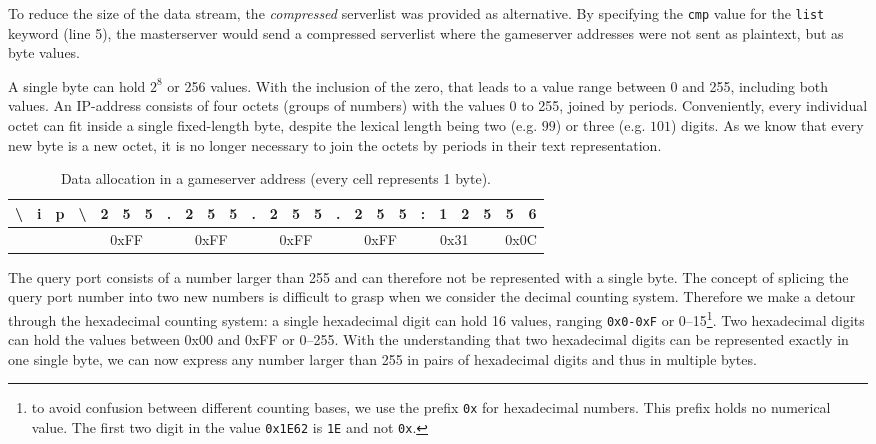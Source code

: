 To reduce the size of the data stream, the \emph{compressed} serverlist was provided as alternative. By specifying the {\tt cmp} value for the {\tt list} keyword (line 5), the masterserver would send a compressed serverlist where the gameserver addresses were not sent as plaintext, but as byte values. 

A single byte can hold $2^8$ or 256 values. With the inclusion of the zero, that leads to a value range between 0 and 255, including both values. An IP-address consists of four octets (groups of numbers) with the values 0 to 255, joined by periods. Conveniently, every individual octet can fit inside a single fixed-length byte, despite the lexical length being two (e.g. $99$) or three (e.g. $101$) digits. As we know that every new byte is a new octet, it is no longer necessary to join the octets by periods in their text representation. 

\begin{table}[h]
\centering
\begin{tabular}{ |c|c|c|c |c|c|c| c |c|c|c| c |c|c|c| c |c|c|c| c |c|c|c|c|c|c| }
\hline
\textbackslash&i&p&\textbackslash&2&5&5&.&2&5&5&.&2&5&5&.&2&5&5&
:&1&2&\multicolumn{2}{|c|}{5}&5&6\\
\hline
\multicolumn{4}{|c|}{} & 
\multicolumn{3}{|c|}{0xFF}& &
\multicolumn{3}{|c|}{0xFF}& & 
\multicolumn{3}{|c|}{0xFF}& & 
\multicolumn{3}{|c|}{0xFF}& & 
\multicolumn{2}{|c}{0x31}& &  %
\multicolumn{3}{|c|}{0x0C}\\
\hline
\end{tabular}
\caption{Data allocation in a gameserver address (every cell represents 1 byte).}
\label{tab:plaintextip}
\end{table}

The query port consists of a number larger than 255 and can therefore not be represented with a single byte. The concept of splicing the query port number into two new numbers is difficult to grasp when we consider the decimal counting system. Therefore we make a detour through the hexadecimal counting system: a single hexadecimal digit can hold 16 values, ranging {\tt 0x0-0xF} or 0--15\footnote{to avoid confusion between different counting bases, we use the prefix {\tt 0x} for hexadecimal numbers. This prefix holds no numerical value. The first two digit in the value {\tt 0x1E62} is {\tt 1E} and not {\tt 0x}.}. Two hexadecimal digits can hold the values between 0x00 and 0xFF or 0--255. With the understanding that two hexadecimal digits can be represented exactly in one single byte, we can now express any number larger than 255 in pairs of hexadecimal digits and thus in multiple bytes.

